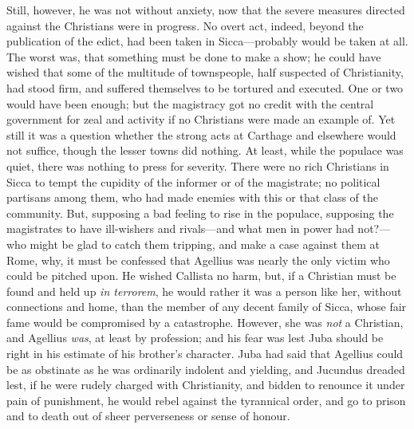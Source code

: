 Still, however, he was not without anxiety, now that the severe
measures directed against the Christians were in progress. No overt
act, indeed, beyond the publication of the edict, had been taken in
Sicca—probably would be taken at all. The worst was, that something
must be done to make a show; he could have wished that some of the
multitude of townspeople, half suspected of Christianity, had stood
firm, and suffered themselves to be tortured and executed. One or two
would have been enough; but the magistracy got no credit with the
central government for zeal and activity if no Christians were made an
example of. Yet still it was a question whether the strong acts at
Carthage and elsewhere would not suffice, though the lesser towns did
nothing. At least, while the populace was quiet, there was nothing to
press for severity. There were no rich Christians in Sicca to tempt
the cupidity of the informer or of the magistrate; no political
partisans among them, who had made enemies with this or that class of
the community. But, supposing a bad feeling to rise in the
populace, supposing the magistrates to have ill-wishers and rivals—and
what men in power had not?—who might be glad to catch them tripping,
and make a case against them at Rome, why, it must be confessed that
Agellius was nearly the only victim who could be pitched upon. He
wished Callista no harm, but, if a Christian must be found and held up
\emph{in terrorem}, he would rather it was a person like her, without
connections and home, than the member of any decent family of Sicca,
whose fair fame would be compromised by a catastrophe. However, she
was \emph{not} a Christian, and Agellius \emph{was}, at least by
profession; and his fear was lest Juba should be right in his estimate
of his brother's character. Juba had said that Agellius could be as
obstinate as he was ordinarily indolent and yielding, and Jucundus
dreaded lest, if he were rudely charged with Christianity, and bidden
to renounce it under pain of punishment, he would rebel against the
tyrannical order, and go to prison and to death out of sheer
perverseness or sense of honour.

